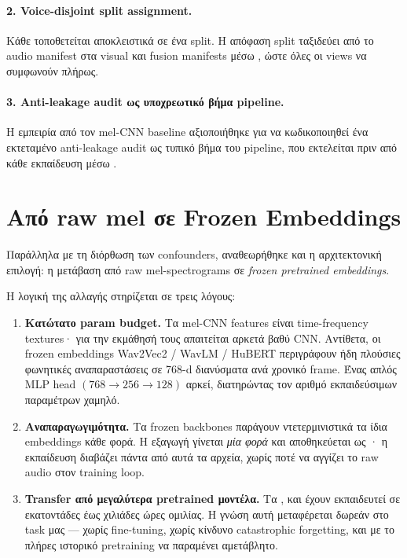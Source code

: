 \paragraph{2. Voice-disjoint split assignment.}
Κάθε  τοποθετείται αποκλειστικά σε ένα split.
Η απόφαση split ταξιδεύει από το audio manifest στα visual και fusion
manifests μέσω ,
ώστε όλες οι views να συμφωνούν πλήρως.

\paragraph{3. Anti-leakage audit ως υποχρεωτικό βήμα pipeline.}
Η εμπειρία από τον mel-CNN baseline αξιοποιήθηκε για να κωδικοποιηθεί
ένα εκτεταμένο anti-leakage audit ως τυπικό βήμα του pipeline,
που εκτελείται πριν από κάθε εκπαίδευση μέσω
.

\section{Από raw mel σε Frozen Embeddings}
\label{sec:mel-to-embeddings}

Παράλληλα με τη διόρθωση των confounders, αναθεωρήθηκε και η αρχιτεκτονική
επιλογή: η μετάβαση από raw mel-spectrograms σε \emph{frozen pretrained embeddings}.

Η λογική της αλλαγής στηρίζεται σε τρεις λόγους:

\begin{enumerate}
  \item \textbf{Κατώτατο param budget.}
        Τα mel-CNN features είναι time-frequency textures·
        για την εκμάθησή τους απαιτείται αρκετά βαθύ CNN.
        Αντίθετα, οι frozen embeddings Wav2Vec2 / WavLM / HuBERT
        περιγράφουν ήδη πλούσιες φωνητικές αναπαραστάσεις
        σε 768-d διανύσματα ανά χρονικό frame.
        Ένας απλός MLP head \((768 \to 256 \to 128)\) αρκεί,
        διατηρώντας τον αριθμό εκπαιδεύσιμων παραμέτρων χαμηλό.

  \item \textbf{Αναπαραγωγιμότητα.}
        Τα frozen backbones παράγουν ντετερμινιστικά τα ίδια embeddings
        κάθε φορά.
        Η εξαγωγή γίνεται \emph{μία φορά} και αποθηκεύεται ως ·
        η εκπαίδευση διαβάζει πάντα από αυτά τα αρχεία,
        χωρίς ποτέ να αγγίζει το raw audio στον training loop.

  \item \textbf{Transfer από μεγαλύτερα pretrained μοντέλα.}
        Τα ,
         και
         έχουν εκπαιδευτεί
        σε εκατοντάδες έως χιλιάδες ώρες ομιλίας.
        Η γνώση αυτή μεταφέρεται δωρεάν στο task μας —
        χωρίς fine-tuning, χωρίς κίνδυνο catastrophic forgetting,
        και με το πλήρες ιστορικό pretraining να παραμένει αμετάβλητο.
\end{enumerate}

